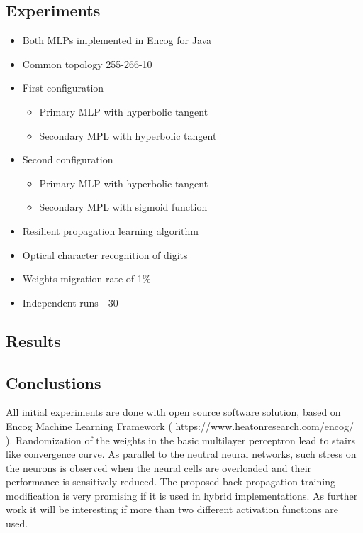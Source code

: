 \documentclass[a0,portrait,25pt]{sciposter}
\begin{document}
\begin{multicols}{3}
\begin{mdframed}[backgroundcolor=white,roundcorner=4pt,shadow=true,linewidth=1pt]
\section*{Experiments}
\begin{itemize}
\item Both MLPs implemented in Encog for Java
\item Common topology 255-266-10
\item First configuration
\begin{itemize}
  \item Primary MLP with hyperbolic tangent
  \item Secondary MPL with hyperbolic tangent
\end{itemize}
\item Second configuration
\begin{itemize}
  \item Primary MLP with hyperbolic tangent
  \item Secondary MPL with sigmoid function
\end{itemize}
\item Resilient propagation learning algorithm
\item Optical character recognition of digits
\item Weights migration rate of 1\%
\item Independent runs - 30
\end{itemize}
\end{mdframed}

\begin{mdframed}[backgroundcolor=white,roundcorner=4pt,shadow=true,linewidth=1pt]
\color{Black}
\section*{Results}
\end{mdframed}

\begin{mdframed}[backgroundcolor=white,roundcorner=4pt,shadow=true,linewidth=1pt]
\color{Black}
\section*{Conclustions}
All initial experiments are done with open source software solution, based on Encog Machine Learning Framework ( https://www.heatonresearch.com/encog/ ). Randomization of the weights in the basic multilayer perceptron lead to stairs like convergence curve. As parallel to the neutral neural networks, such stress on the neurons is observed when the neural cells are overloaded and their performance is sensitively reduced. The proposed back-propagation training modification is very promising if it is used in hybrid implementations. As further work it will be interesting if more than two different activation functions are used. 
\end{mdframed}


\end{multicols}
\end{document}
